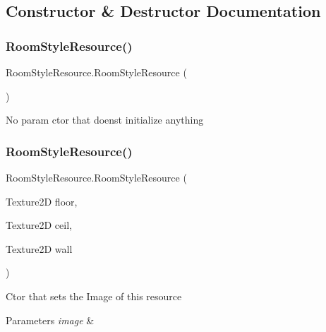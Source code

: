 \subsection{Constructor \& Destructor Documentation}
\mbox{\label{class_room_style_resource_a207acd092d1aac00169f329097e836fc}} 
\subsubsection{\texorpdfstring{Room\+Style\+Resource()}{RoomStyleResource()}\hspace{0.1cm}{\footnotesize\ttfamily [1/2]}}
{\footnotesize\ttfamily Room\+Style\+Resource.\+Room\+Style\+Resource (\begin{DoxyParamCaption}{ }\end{DoxyParamCaption})}



No param ctor that doens\textquotesingle{}t initialize anything 

\mbox{\label{class_room_style_resource_aa269ae01fc600ab23b7f7ce6a742a3f5}} 
\subsubsection{\texorpdfstring{Room\+Style\+Resource()}{RoomStyleResource()}\hspace{0.1cm}{\footnotesize\ttfamily [2/2]}}
{\footnotesize\ttfamily Room\+Style\+Resource.\+Room\+Style\+Resource (\begin{DoxyParamCaption}\item[{Texture2D}]{floor,  }\item[{Texture2D}]{ceil,  }\item[{Texture2D}]{wall }\end{DoxyParamCaption})}



Ctor that sets the Image of this resource 


\begin{DoxyParams}{Parameters}
{\em image} & \\
\hline
\end{DoxyParams}



